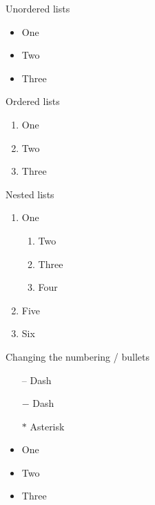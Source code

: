 \documentclass[12pt,twoside,a4paper]{article}
\begin{document}
 

Unordered lists
\begin{itemize}
	\item One
	\item Two
	\item Three
\end{itemize}


Ordered lists
\begin{enumerate}
	\item One
	\item Two
	\item Three
\end{enumerate}

Nested lists

\begin{enumerate}
	\item One
	\begin{enumerate}
		\item Two
		\item Three
		\item Four
	\end{enumerate}
	\item Five
	\item Six
\end{enumerate}

Changing the numbering / bullets

\begin{itemize}
	\item[--] Dash
	\item[$-$] Dash
	\item[$\ast$] Asterisk
\end{itemize}

\begin{itemize}
	\item One
	\item Two
	\item Three
\end{itemize}
\end{document}
